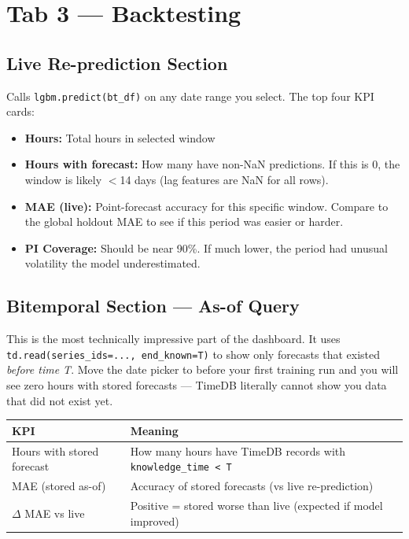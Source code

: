 \documentclass[12pt, a4paper, oneside]{memoir}
\newcommand{\code}[1]{\texttt{\footnotesize #1}}
\begin{document}
\section{Tab 3 --- Backtesting}

\subsection{Live Re-prediction Section}

Calls \code{lgbm.predict(bt\_df)} on any date range you select. The top four KPI cards:
\begin{itemize}
  \item \textbf{Hours:} Total hours in selected window
  \item \textbf{Hours with forecast:} How many have non-NaN predictions. If this is 0,
    the window is likely $<$14 days (lag features are NaN for all rows).
  \item \textbf{MAE (live):} Point-forecast accuracy for this specific window.
    Compare to the global holdout MAE to see if this period was easier or harder.
  \item \textbf{PI Coverage:} Should be near 90\%. If much lower, the period had unusual
    volatility the model underestimated.
\end{itemize}

\subsection{Bitemporal Section --- As-of Query}

\begin{keyidea}
This is the most technically impressive part of the dashboard. It uses
\code{td.read(series\_ids=..., end\_known=T)} to show only forecasts that existed
\emph{before time T}. Move the date picker to before your first training run and you
will see zero hours with stored forecasts --- TimeDB literally cannot show you data
that did not exist yet.
\end{keyidea}

\begin{center}
\begin{tabular}{ll}
\toprule
\textbf{KPI} & \textbf{Meaning} \\
\midrule
Hours with stored forecast & How many hours have TimeDB records with \code{knowledge\_time < T} \\
MAE (stored as-of)         & Accuracy of stored forecasts (vs live re-prediction) \\
$\Delta$ MAE vs live       & Positive = stored worse than live (expected if model improved) \\
\bottomrule
\end{tabular}
\end{center}
\end{document}
